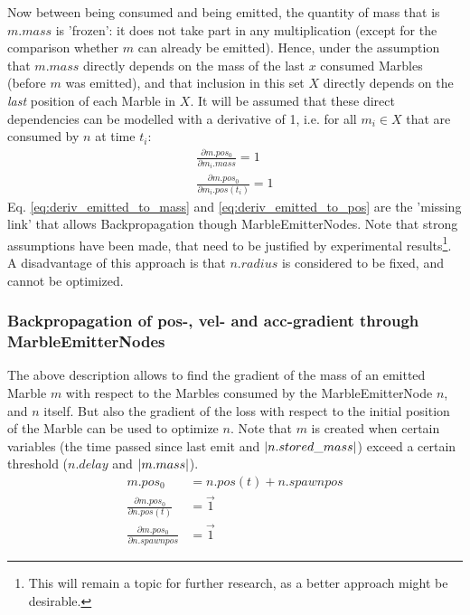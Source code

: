 Now between being consumed and being emitted, the quantity of mass that is $m.mass$ is 'frozen': it does not take part in any multiplication (except for the comparison whether $m$ can already be emitted). Hence, under the assumption that $m.mass$ directly depends on the mass of the last $x$ consumed Marbles (before $m$ was emitted), and that inclusion in this set $X$ directly depends on the \textit{last} position of each Marble in $X$. It will be assumed that these direct dependencies can be modelled with a derivative of 1, i.e. for all $m_i \in X$ that are consumed by $n$ at time $t_i$:
\begin{align}
    \frac{\partial m.pos_0}{\partial m_i.mass} = 1 \label{eq:deriv_emitted_to_mass}\\
    \frac{\partial m.pos_0}{\partial m_i.pos(t_i)} = 1 \label{eq:deriv_emitted_to_pos}
\end{align}
Eq. \ref{eq:deriv_emitted_to_mass} and \eqref{eq:deriv_emitted_to_pos} are the 'missing link' that allows Backpropagation though MarbleEmitterNodes. Note that strong assumptions have been made, that need to be justified by experimental results\footnote{This will remain a topic for further research, as a better approach might be desirable.}. 
A disadvantage of this approach is that $n.radius$ is considered to be fixed, and cannot be optimized.


\subsubsection{Backpropagation of pos-, vel- and acc-gradient through MarbleEmitterNodes}
The above description allows to find the gradient of the mass of an emitted Marble $m$ with respect to the Marbles consumed by the MarbleEmitterNode $n$, and $n$ itself. But also the gradient of the loss with respect to the initial position of the Marble can be used to optimize $n$. Note that $m$ is created when certain variables (the time passed since last emit and $\lvert n.stored\_mass \rvert$) exceed a certain threshold ($n.delay$ and $\lvert m.mass \rvert$). 
\begin{align}
    m.pos_0 &= n.pos(t) + n.spawnpos \\
    \frac{\partial m.pos_0}{\partial n.pos(t)} &= \vec{1} \\
    \frac{\partial m.pos_0}{\partial n.spawnpos} &= \vec{1}
\end{align}

